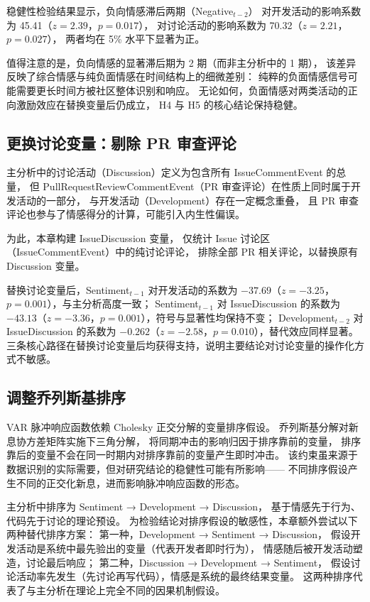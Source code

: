 稳健性检验结果显示，负向情感滞后两期（Negative$_{t-2}$）
对开发活动的影响系数为 45.41（$z = 2.39$，$p = 0.017$），
对讨论活动的影响系数为 70.32（$z = 2.21$，$p = 0.027$），
两者均在 5\% 水平下显著为正。

值得注意的是，负向情感的显著滞后期为 2 期（而非主分析中的 1 期），
该差异反映了综合情感与纯负面情感在时间结构上的细微差别：
纯粹的负面情感信号可能需要更长时间方被社区整体识别和响应。
无论如何，负面情感对两类活动的正向激励效应在替换变量后仍成立，
H4 与 H5 的核心结论保持稳健。

\subsection{更换讨论变量：剔除 PR 审查评论}

主分析中的讨论活动（Discussion）定义为包含所有 IssueCommentEvent 的总量，
但 PullRequestReviewCommentEvent（PR 审查评论）在性质上同时属于开发活动的一部分，
与开发活动（Development）存在一定概念重叠，
且 PR 审查评论也参与了情感得分的计算，可能引入内生性偏误。

为此，本章构建 IssueDiscussion 变量，
仅统计 Issue 讨论区（IssueCommentEvent）中的纯讨论评论，
排除全部 PR 相关评论，以替换原有 Discussion 变量。

替换讨论变量后，Sentiment$_{t-1}$ 对开发活动的系数为
$-37.69$（$z = -3.25$，$p = 0.001$），与主分析高度一致；
Sentiment$_{t-1}$ 对 IssueDiscussion 的系数为
$-43.13$（$z = -3.36$，$p = 0.001$），符号与显著性均保持不变；
Development$_{t-2}$ 对 IssueDiscussion 的系数为
$-0.262$（$z = -2.58$，$p = 0.010$），替代效应同样显著。
三条核心路径在替换讨论变量后均获得支持，说明主要结论对讨论变量的操作化方式不敏感。

\subsection{调整乔列斯基排序}

VAR 脉冲响应函数依赖 Cholesky 正交分解的变量排序假设。
乔列斯基分解对新息协方差矩阵实施下三角分解，
将同期冲击的影响归因于排序靠前的变量，
排序靠后的变量不会在同一时期内对排序靠前的变量产生即时冲击。
该约束虽来源于数据识别的实际需要，但对研究结论的稳健性可能有所影响——
不同排序假设产生不同的正交化新息，进而影响脉冲响应函数的形态。

主分析中排序为 Sentiment → Development → Discussion，
基于情感先于行为、代码先于讨论的理论预设。
为检验结论对排序假设的敏感性，本章额外尝试以下两种替代排序方案：
第一种，Development → Sentiment → Discussion，
假设开发活动是系统中最先验出的变量（代表开发者即时行为），
情感随后被开发活动塑造，讨论最后响应；
第二种，Discussion → Development → Sentiment，
假设讨论活动率先发生（先讨论再写代码），情感是系统的最终结果变量。
这两种排序代表了与主分析在理论上完全不同的因果机制假设。

